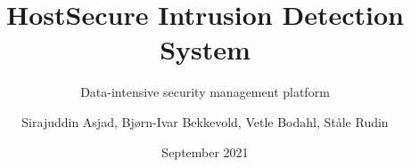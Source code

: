 \documentclass[aspectratio=1610]{beamer}
\title{HostSecure Intrusion Detection System}
\subtitle{Data-intensive security management platform}
\author[Data Management]{Sirajuddin Asjad, Bjørn-Ivar Bekkevold, Vetle Bodahl, Ståle Rudin}
\date{September 2021}
\institute[USN]{University of South-Eastern Norway\\Campus Kongsberg}
\begin{document}
    \frame{\titlepage}
    
    
\end{document}

